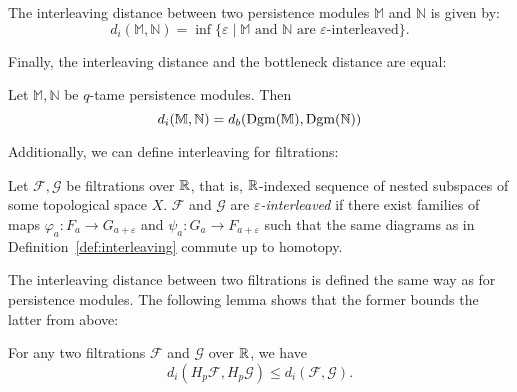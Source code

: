 \begin{definition}
    The interleaving distance between two persistence modules $\mathbb{M}$ and
    $\mathbb{N}$ is given by:
    \begin{equation}
        d_i(\mathbb{M}, \mathbb{N}) = \inf \{\varepsilon \mid \text{$\mathbb{M}$ and $\mathbb{N}$ are $\varepsilon$-interleaved}\}.
    \end{equation}
\end{definition}

Finally, the interleaving distance and the bottleneck distance are equal:
\begin{theorem}
    Let $\mathbb{M}, \mathbb{N}$ be $q$-tame persistence modules. Then
    \begin{equation}
        d_i(\mathbb{M}, \mathbb{N}) = d_b(\operatorname{Dgm}(\mathbb{M}), \operatorname{Dgm}(\mathbb{N}))
    \end{equation}
\end{theorem}

Additionally, we can define interleaving for filtrations:
\begin{definition}
    Let $\mathcal{F}, \mathcal{G}$ be filtrations over $\mathbb{R}$, that is,
    $\mathbb{R}$-indexed sequence of nested subspaces of some topological space $X$.
    $\mathcal{F}$ and $\mathcal{G}$ are \emph{$\varepsilon$-interleaved}
    if there exist families of maps $\varphi_a : F_a \to G_{a + \varepsilon}$
    and $\psi_a : G_a \to F_{a + \varepsilon}$ such that the same diagrams as in
    Definition~\ref{def:interleaving} commute up to homotopy.
\end{definition}
The interleaving distance between two filtrations is defined the same way as for
persistence modules. The following lemma shows that the former bounds the latter
from above:
\begin{lemma}
    \label{lem:interleaving_distance}
    For any two filtrations $\mathcal{F}$ and $\mathcal{G}$ over $\mathbb{R}$, we
    have
    \begin{equation}
        d_i(H_p \mathcal{F}, H_p \mathcal{G}) \leq d_i(\mathcal{F}, \mathcal{G}).
    \end{equation}
\end{lemma}

